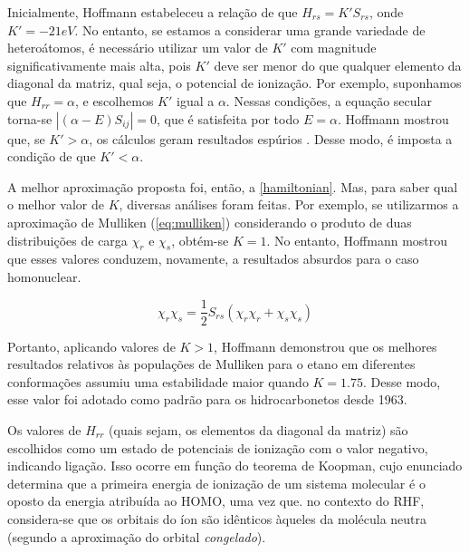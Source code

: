 Inicialmente, Hoffmann estabeleceu a relação de que $H_{rs} = K' S_{rs}$, onde $K' = -21 eV$. No entanto, se estamos a considerar uma grande variedade de heteroátomos, é necessário utilizar um valor de $K'$ com magnitude significativamente mais alta, pois $K'$ deve ser menor do que qualquer elemento da diagonal da matriz, qual seja, o potencial de ionização. Por exemplo, suponhamos que $H_{rr} = \alpha$, e escolhemos $K'$ igual a $\alpha$. Nessas condições, a equação secular torna-se $|(\alpha - E)S_{ij}| = 0$, que é satisfeita por todo $E = \alpha$. Hoffmann mostrou que, se $K' > \alpha$, os cálculos geram resultados espúrios \autocite{Hoffmann1963}. Desse modo, é imposta a condição de que $K' < \alpha$.

A melhor aproximação proposta foi, então, a \autoref{hamiltonian}. Mas, para saber qual o melhor valor de $K$, diversas análises foram feitas. Por exemplo, se utilizarmos a aproximação de Mulliken (\autoref{eq:mulliken}) considerando o produto de duas distribuições de carga $\chi_r$ e $\chi_s$, obtém-se $K=1$. No entanto, Hoffmann mostrou que esses valores conduzem, novamente, a resultados absurdos para o caso homonuclear.

\begin{equation}
\label{eq:mulliken}
    \chi_r \chi_s = \frac{1}{2} S_{rs}(\chi_r \chi_r + \chi_s \chi_s)
\end{equation}

Portanto, aplicando valores de $K > 1$, Hoffmann \autocite{Hoffmann1963} demonstrou que os melhores resultados relativos às populações de Mulliken para o etano em diferentes conformações assumiu uma estabilidade maior quando $K = 1.75$. Desse modo, esse valor foi adotado como padrão para os hidrocarbonetos desde 1963.

 Os valores de $H_{rr}$ (quais sejam, os elementos da diagonal da matriz) são escolhidos como um estado de potenciais de ionização com o valor negativo, indicando ligação. Isso ocorre em função do teorema de Koopman\autocite{Koopmans1934}, cujo enunciado determina que a primeira energia de ionização de um sistema molecular é o oposto da energia atribuída ao \gls{HOMO}, uma vez que. no contexto do \gls{RHF}, considera-se que os orbitais do íon são idênticos àqueles da molécula neutra (segundo a aproximação do orbital \textit{congelado}). 

